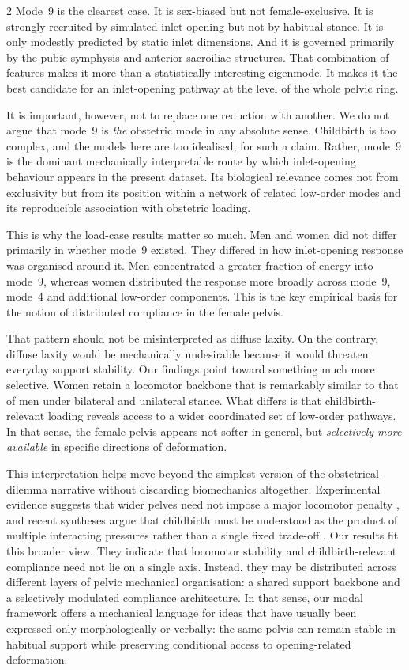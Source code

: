 \documentclass[openacc]{rsproca_new}
\begin{document}
\begin{multicols}{2}
Mode~9 is the clearest case. It is sex-biased but not female-exclusive. It is strongly recruited by simulated inlet opening but not by habitual stance. It is only modestly predicted by static inlet dimensions. And it is governed primarily by the pubic symphysis and anterior sacroiliac structures. That combination of features makes it more than a statistically interesting eigenmode. It makes it the best candidate for an inlet-opening pathway at the level of the whole pelvic ring.

It is important, however, not to replace one reduction with another. We do not argue that mode~9 is \emph{the} obstetric mode in any absolute sense. Childbirth is too complex, and the models here are too idealised, for such a claim. Rather, mode~9 is the dominant mechanically interpretable route by which inlet-opening behaviour appears in the present dataset. Its biological relevance comes not from exclusivity but from its position within a network of related low-order modes and its reproducible association with obstetric loading.

This is why the load-case results matter so much. Men and women did not differ primarily in whether mode~9 existed. They differed in how inlet-opening response was organised around it. Men concentrated a greater fraction of energy into mode~9, whereas women distributed the response more broadly across mode~9, mode~4 and additional low-order components. This is the key empirical basis for the notion of distributed compliance in the female pelvis.

That pattern should not be misinterpreted as diffuse laxity. On the contrary, diffuse laxity would be mechanically undesirable because it would threaten everyday support stability. Our findings point toward something much more selective. Women retain a locomotor backbone that is remarkably similar to that of men under bilateral and unilateral stance. What differs is that childbirth-relevant loading reveals access to a wider coordinated set of low-order pathways. In that sense, the female pelvis appears not softer in general, but \emph{selectively more available} in specific directions of deformation.

This interpretation helps move beyond the simplest version of the obstetrical-dilemma narrative without discarding biomechanics altogether. Experimental evidence suggests that wider pelves need not impose a major locomotor penalty \cite{Warrener2015}, and recent syntheses argue that childbirth must be understood as the product of multiple interacting pressures rather than a single fixed trade-off \cite{Pavlicev2020,Haeusler2021,Grunstra2023}. Our results fit this broader view. They indicate that locomotor stability and childbirth-relevant compliance need not lie on a single axis. Instead, they may be distributed across different layers of pelvic mechanical organisation: a shared support backbone and a selectively modulated compliance architecture. In that sense, our modal framework offers a mechanical language for ideas that have usually been expressed only morphologically or verbally: the same pelvis can remain stable in habitual support while preserving conditional access to opening-related deformation.


\end{multicols}
\end{document}
